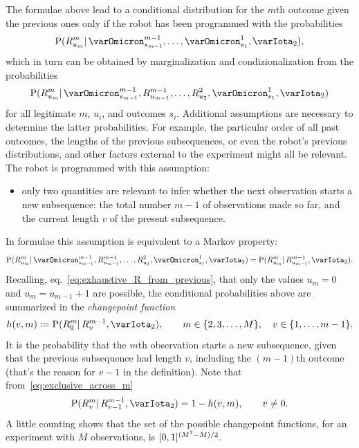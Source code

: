 \documentclass[\ifafour a4paper,12pt,\else a5paper,10pt,\fi%
onecolumn,oneside,article,%
british%
]{memoir}
\theoremstyle{remark}
\theoremstyle{innote}
\newcommand*{\defd}{\coloneqq}
\DeclarePairedDelimiter\clcl{[}{]}
\DeclarePairedDelimiter\set{\{}{\}}
\newcommand*{\p}{\mathrm{P}}%
\renewcommand*{\|}{\mathpunct{|}}
\newcommand*{\eqn}{eq.}%
\newcommand*{\yI}{\varIota}
\newcommand*{\yO}{\varOmicron}
\newcommand*{\yMc}{\yI_2}
\newcommand*{\yrs}{h}
\begin{document}
The formulae above lead to a conditional distribution for the $m$th outcome
given the previous ones only if the robot has been programmed with the
probabilities
\begin{equation}
  \label{eq:prob_R_conditional_only_data_before}
  \p(R^{m}_{u_{m}} \| \yO^{m-1}_{s_{m-1}},\dotsc, \yO^{1}_{s_{1}}, \yMc),
\end{equation}
which in turn can be obtained by marginalization and condizionalization
from the probabilities
\begin{equation}
  \label{eq:prob_R_conditional_before}
  \p(R^{m}_{u_{m}} \| \yO^{m-1}_{s_{m-1}}, R^{m-1}_{u_{m-1}},\dotsc,
  R^{2}_{u_{2}}, \yO^{1}_{s_{1}}, \yMc)
\end{equation}
for all legitimate $m$, $u_i$, and outcomes $s_i$. Additional assumptions
are necessary to determine the latter probabilities. For example, the
particular order of all past outcomes, the lengths of the previous
subsequences, or even the robot's previous distributions, and other factors
external to the experiment might all be relevant. The robot is programmed
with this assumption:
\begin{itemize}
\item only two quantities are relevant to infer whether the next
  observation starts a new subsequence: the total number $m-1$ of
  observations made so far, and the current length $v$ of the present
  subsequence.
\end{itemize}
In formulae this assumption is equivalent to a Markov property:
\begin{equation}
  \label{eq:prob_R_markov}
  \p(R^{m}_{u_{m}} \| \yO^{m-1}_{s_{m-1}}, R^{m-1}_{u_{m-1}},\dotsc,
  R^{2}_{u_{2}}, \yO^{1}_{s_{1}}, \yMc) =
  \p(R^{m}_{u_{m}} \|  R^{m-1}_{u_{m-1}}, \yMc).
\end{equation}
Recalling, \eqn~\eqref{eq:exhaustive_R_from_previous}, that only the values
$u_{m}=0$ and $u_{m}= u_{m-1}+1$ are possible, the conditional
probabilities above are summarized in the \emph{changepoint function}
\begin{equation}\label{eq:def_changepoint_function}
  \yrs(v,m)  \defd \p(R^{m}_{0} \|  R^{m-1}_{v}, \yMc),
  \qquad m \in\set{2,3,\dotsc,M}, \quad v\in\set{1,\dotsc,m-1}.
\end{equation}
It is the probability that the $m$th observation starts a new subsequence,
given that the previous subsequence had length $v$, including the $(m-1)$th
outcome (that's the reason for $v-1$ in the definition). Note that
from~\eqref{eq:exclusive_across_m}
\begin{equation}\label{eq:one_minus_h}
  \p(R^{m}_{v} \|  R^{m-1}_{v-1}, \yMc)  = 1-\yrs(v,m),\qquad v\ne 0.
\end{equation}
A little counting shows that the set of the possible changepoint functions,
for an experiment with $M$ observations, is $\clcl{0,1}^{(M^2-M)/2}$.
\end{document}
